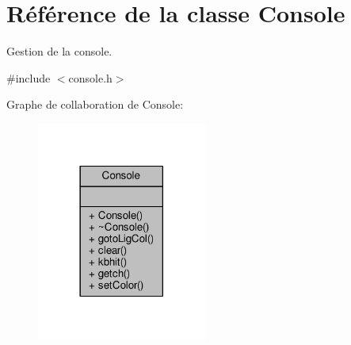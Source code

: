 \hypertarget{classConsole}{}\section{Référence de la classe Console}
\label{classConsole}


Gestion de la console.  




{\ttfamily \#include $<$console.\+h$>$}



Graphe de collaboration de Console\+:\nopagebreak
\begin{figure}[H]
\begin{center}
\leavevmode
\includegraphics[width=158pt]{classConsole__coll__graph}
\end{center}
\end{figure}
